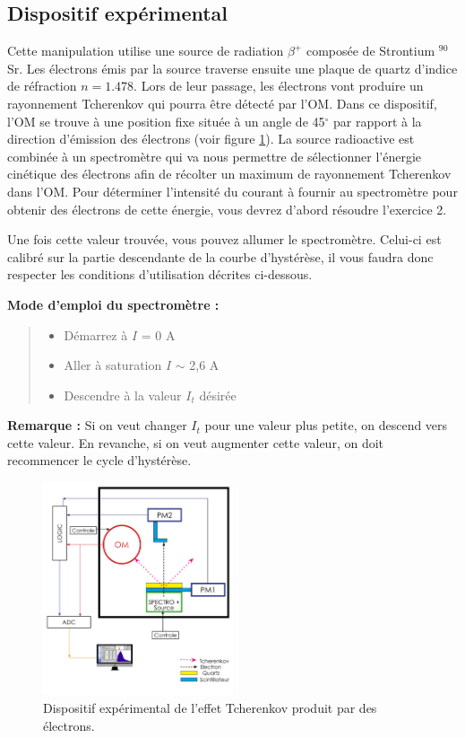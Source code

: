 \subsection{Dispositif expérimental}
Cette manipulation utilise une source de radiation $\beta^+$ composée de Strontium $^{90}$Sr. Les électrons émis par la source traverse ensuite une plaque de quartz d'indice de réfraction  $n = 1.478$. Lors de leur passage, les électrons vont produire un rayonnement Tcherenkov qui pourra être détecté par l'OM. Dans ce dispositif, l'OM se trouve à une position fixe située à un angle de 45$^{\circ}$ par rapport à la direction d'émission des électrons (voir figure \ref{fig:dispo1}). La source radioactive est combinée à un spectromètre qui va nous permettre de sélectionner l'énergie cinétique des électrons afin de récolter un maximum de rayonnement Tcherenkov dans l'OM. Pour déterminer l'intensité du courant à fournir au spectromètre pour obtenir des électrons de cette énergie, vous devrez d'abord résoudre l'exercice 2.

Une fois cette valeur trouvée, vous pouvez allumer le spectromètre. Celui-ci est calibré sur la partie descendante de la courbe d'hystérèse, il vous faudra donc respecter les conditions d'utilisation décrites ci-dessous.

\textbf{Mode d'emploi du spectromètre :}
\begin{quote}
    \begin{itemize}
        \item Démarrez à $I$ = 0 A
        \item Aller à saturation $I$ $\sim$ 2,6 A
        \item Descendre à la valeur $I_t$ désirée
    \end{itemize}
\end{quote}
\textbf{Remarque :} Si on veut changer $I_t$ pour une valeur plus petite, on descend vers cette valeur. En revanche, si on veut augmenter cette valeur, on doit recommencer le cycle d'hystérèse. 

\begin{figure}
    \centering
    \includegraphics[width=0.5\textwidth]{figures/Dispositif_1.png}
    \caption{Dispositif expérimental de l'effet Tcherenkov produit par des électrons.}
    \label{fig:dispo1} 
\end{figure}

